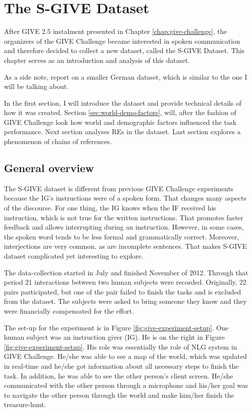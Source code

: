 \chapter{The S-GIVE Dataset}
After GIVE 2.5 instalment presented in Chapter \ref{chap:give-challenge}, the organizers of the GIVE Challenge became interested in spoken communication and therefore decided to collect a new dataset, called the S-GIVE Dataset. This chapter serves as an introduction and analysis of this dataset.

As a side note, \citet{striegnitz2012referring} report on a smaller German dataset, which is similar to the one I will be talking about. 

In the first section, I will introduce the dataset and provide technical details of how it was created. Section \ref{sec:world-demo-factors}, will, after the fashion of GIVE Challenge look how world and demographic factors influenced the task performance. Next section analyses REs in the dataset. Last section explores a phenomenon of chains of references.

\section{General overview}
\label{sec:general-overview}
The S-GIVE dataset is different from previous GIVE Challenge experiments because the IG's instructions were of a spoken form. That changes many aspects of the discourse. For one thing, the IG knows when the IF received his instruction, which is not true for the written instructions. That promotes faster feedback and allows interrupting during an instruction. However, in some cases, the spoken word tends to be less formal and grammatically correct. Moreover, interjections are very common, as are incomplete sentences. That makes S-GIVE dataset complicated yet interesting to explore.

The data-collection started in July and finished November of 2012. Through that period 21 interactions between two human subjects were recorded. Originally, 22 pairs participated, but one of the pair failed to finish the tasks and is excluded from the dataset. The subjects were asked to bring someone they know and they were financially compensated for the effort. 

The set-up for the experiment is in Figure \ref{fig:give-experiment-setup}. One human subject was an instruction giver (IG). He is on the right in Figure \ref{fig:give-experiment-setup}. His role was essentially the role of NLG system in GIVE Challenge. He/she was able to see a map of the world, which was updated in real-time and he/she got information about all necessary steps to finish the task. In addition, he was able to see the other person's client screen. He/she communicated with the other person through a microphone and his/her goal was to navigate the other person through the world and make him/her finish the treasure-hunt.

